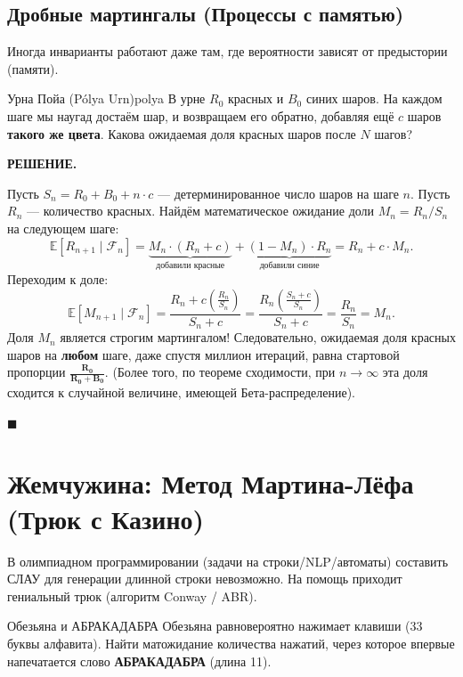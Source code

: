 \documentclass[12pt,a4paper]{article}
\newcommand{\nicefrac}[2]{#1/#2}
\newcommand{\E}{\mathbb{E}}
\newcommand{\F}{\mathcal{F}}
\newenvironment{solution}{
    \begin{tcolorbox}[
        enhanced, breakable, blanker,
        borderline west={2.5pt}{0pt}{solgray},
        left=12pt, top=5pt, bottom=5pt,
        before skip=10pt, after skip=15pt
    ]
    \textbf{\textsf{РЕШЕНИЕ.}}\;
}{
    \hfill $\blacksquare$
    \end{tcolorbox}
}
\begin{document}
\subsection{Дробные мартингалы (Процессы с памятью)}

Иногда инварианты работают даже там, где вероятности зависят от предыстории (памяти).

\begin{problem}{Урна Пойа (Pólya Urn)}{polya}
В урне $R_0$ красных и $B_0$ синих шаров. На каждом шаге мы наугад достаём шар, и возвращаем его обратно, добавляя ещё $c$ шаров \textbf{такого же цвета}. Какова ожидаемая доля красных шаров после $N$ шагов?
\end{problem}

\begin{solution}
Пусть $S_n = R_0 + B_0 + n \cdot c$ --- детерминированное число шаров на шаге $n$. Пусть $R_n$ --- количество красных. Найдём математическое ожидание доли $M_n = \nicefrac{R_n}{S_n}$ на следующем шаге:
\[
\E[R_{n+1} \mid \F_n] = \underbrace{M_n \cdot (R_n + c)}_{\text{добавили красные}} + \underbrace{(1 - M_n) \cdot R_n}_{\text{добавили синие}} = R_n + c \cdot M_n.
\]
Переходим к доле:
\[
\E[M_{n+1} \mid \F_n] = \frac{R_n + c \left(\frac{R_n}{S_n}\right)}{S_n + c} = \frac{R_n \left(\frac{S_n + c}{S_n}\right)}{S_n + c} = \frac{R_n}{S_n} = M_n.
\]
Доля $M_n$ является строгим мартингалом! Следовательно, ожидаемая доля красных шаров на \textbf{любом} шаге, даже спустя миллион итераций, равна стартовой пропорции $\mathbf{\frac{R_0}{R_0 + B_0}}$. (Более того, по теореме сходимости, при $n \to \infty$ эта доля сходится к случайной величине, имеющей Бета-распределение).
\end{solution}

\section{Жемчужина: Метод Мартина-Лёфа (Трюк с Казино)}

В олимпиадном программировании (задачи на строки/NLP/автоматы) составить СЛАУ для генерации длинной строки невозможно. На помощь приходит гениальный трюк (алгоритм Conway / ABR).

\begin{problem}{Обезьяна и АБРАКАДАБРА}{}
Обезьяна равновероятно нажимает клавиши (33 буквы алфавита). Найти матожидание количества нажатий, через которое впервые напечатается слово \textbf{АБРАКАДАБРА} (длина 11).
\end{problem}
\end{document}
